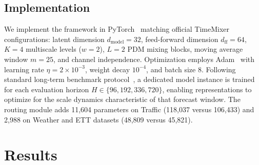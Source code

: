 \documentclass[journal]{IEEEtran}
\begin{document}
\subsection{Implementation}
We implement the framework in PyTorch~\cite{paszke2019pytorch} matching official TimeMixer configurations: latent dimension $d_{\text{model}}=32$, feed-forward dimension $d_{\text{ff}}=64$, $K=4$ multiscale levels ($w=2$), $L=2$ PDM mixing blocks, moving average window $m=25$, and channel independence. Optimization employs Adam~\cite{kingma2015adam} with learning rate $\eta = 2\times10^{-3}$, weight decay $10^{-4}$, and batch size 8. Following standard long-term benchmark protocol~\cite{wang2024timemixer,zhou2021informer}, a dedicated model instance is trained for each evaluation horizon $H \in \{96, 192, 336, 720\}$, enabling representations to optimize for the scale dynamics characteristic of that forecast window. The routing module adds 11,604 parameters on Traffic (118,037 versus 106,433) and 2,988 on Weather and ETT datasets (48,809 versus 45,821).

\section{Results}
\label{sec:results}
\end{document}
